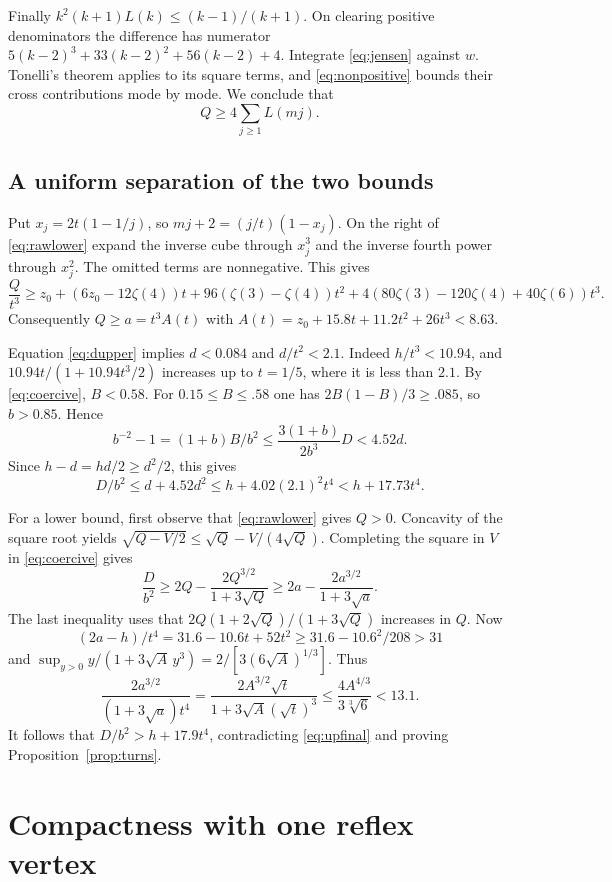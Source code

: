 \documentclass[11pt,a4paper,reqno]{amsart}
\theoremstyle{remark}
\numberwithin{equation}{section}
\begin{document}
Finally $k^2(k+1)L(k)\le(k-1)/(k+1)$. On clearing positive denominators
the difference has numerator $5(k-2)^3+33(k-2)^2+56(k-2)+4$. Integrate
\eqref{eq:jensen} against $w$. Tonelli's theorem applies to its square
terms, and \eqref{eq:nonpositive} bounds their cross contributions mode by
mode. We conclude that
\begin{equation}\label{eq:rawlower}
                     Q\ge4\sum_{j\ge1} L(mj).
\end{equation}

\subsection{A uniform separation of the two bounds}
Put $x_j=2t(1-1/j)$, so $mj+2=(j/t)(1-x_j)$. On the right of
\eqref{eq:rawlower} expand the inverse cube through $x_j^3$ and the inverse
fourth power through $x_j^2$. The omitted terms are nonnegative. This gives
\[
 \frac Q{t^3}\ge z_0+(6z_0-12\zeta(4))t+
 96(\zeta(3)-\zeta(4))t^2+
 4(80\zeta(3)-120\zeta(4)+40\zeta(6))t^3 .
\]
Consequently $Q\ge a=t^3 A(t)$ with
$A(t)=z_0+15.8t+11.2t^2+26t^3<8.63$.

Equation \eqref{eq:dupper} implies $d<0.084$ and $d/t^2<2.1$. Indeed
$h/t^3<10.94$, and $10.94t/(1+10.94t^3/2)$ increases up to $t=1/5$,
where it is less than $2.1$. By \eqref{eq:coercive}, $B<0.58$.
For $0.15\le B\le.58$ one has $2B(1-B)/3\ge.085$, so $b>0.85$. Hence
\[
 b^{-2}-1=(1+b)B/b^2\le\frac{3(1+b)}{2b^3}D<4.52d .
\]
Since $h-d=hd/2\ge d^2/2$, this gives
\begin{equation}\label{eq:upfinal}
                 D/b^2\le d+4.52d^2\le h+4.02(2.1)^2t^4<h+17.73t^4 .
\end{equation}

For a lower bound, first observe that \eqref{eq:rawlower} gives $Q>0$.
Concavity of the square
root yields $\sqrt{Q-V/2}\le\sqrt Q-V/(4\sqrt Q)$. Completing the square
in $V$ in \eqref{eq:coercive} gives
\[
 \frac{D}{b^2}\ge 2Q-\frac{2Q^{3/2}}{1+3\sqrt Q}
        \ge 2a-\frac{2a^{3/2}}{1+3\sqrt a}.
\]
The last inequality uses that $2Q(1+2\sqrt Q)/(1+3\sqrt Q)$ increases in $Q$.
Now
\[
 (2a-h)/t^4=31.6-10.6t+52t^2\ge31.6-10.6^2/208>31
\]
and $\sup_{y>0} y/(1+3\sqrt A\,y^3)=2/[3(6\sqrt A)^{1/3}]$. Thus
\[
 \frac{2a^{3/2}}{(1+3\sqrt a)t^4}
   =\frac{2A^{3/2}\sqrt t}{1+3\sqrt A(\sqrt t)^3}
   \le\frac{4 A^{4/3}}{3\sqrt[3]6}<13.1 .
\]
It follows that $D/b^2>h+17.9t^4$, contradicting \eqref{eq:upfinal} and
proving Proposition~\ref{prop:turns}.

\section{Compactness with one reflex vertex}\label{sec:compact}
\end{document}

